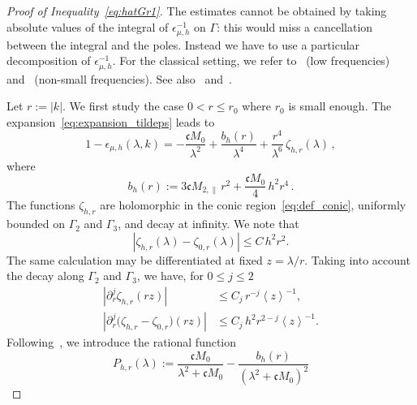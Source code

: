 \documentclass[a4paper,12pt]{amsart} %
\theoremstyle{plain}
\theoremstyle{definition}
\newcommand		{\lt}			{\left}				%
\newcommand		{\rt}			{\right}			%
\renewcommand	{\(}			{\lt(}
\renewcommand	{\)}			{\rt)}
\newcommand		{\bangle}[1]	{\lt\langle #1\rt\rangle}
\newcommand		{\weight}[1]	{\bangle{#1}}	%
\newcommand		{\n}[1]			{\lt\lvert{#1}\rt\rvert}	%
\newcommand	{\h}			{h}
\newcommand		{\CK}			{\mathfrak{c}}	%
\begin{document}
	\begin{proof}[Proof of Inequality~\eqref{eq:hatGr1}]
		The estimates cannot be obtained by taking absolute values of the integral of $\epsilon_{\mu,\h}^{-1}$ on $\Gamma$: this would miss a cancellation between the integral and the poles. Instead we have to use a particular decomposition of $\epsilon_{\mu,\h}^{-1}$. For the classical setting, we refer to~\cite[Lemma~2.7]{bedrossian_linearized_2022} (low frequencies) and~\cite[Lemma~2.8]{bedrossian_linearized_2022} (non-small frequencies). See also~\cite[Section~5.2.3]{han-kwan_linearized_2021} and~\cite[Theorem~1.2~(ii), especially~(1.25)]{ionescu_stability_2023}.

		Let $r := \n{k}$. We first study the case $0<r\leq r_0$ where $r_0$ is small enough. 
		The expansion~\eqref{eq:expansion_tildeps} leads to 
		\begin{equation}\label{eq:Lh-ray-expansion}
			1-\epsilon_{\mu,\h}(\lambda,k) = - \frac{\CK M_0}{\lambda^2} +\frac{b_\h(r)}{\lambda^4} + \frac{r^4}{\lambda^6} \, \zeta_{\h,r}(\lambda) \, ,
		\end{equation}
		where
		\begin{equation*}
			b_\h(r) := 3\CK M_{2,\parallel} \, r^2 +\frac{\CK M_0}{4} \, h^2r^4 \, .
		\end{equation*}
		The functions $\zeta_{\h,r}$ are holomorphic in the conic region~\eqref{eq:def_conic}, uniformly bounded on $\Gamma_2$ and $\Gamma_3$, and decay at infinity. 
		We note that
		\begin{equation}\label{eq:zeta-quantum-classical-difference}
			\n{\zeta_{\h,r}(\lambda)-\zeta_{0,r}(\lambda)} \leq C\, h^2r^2 .
		\end{equation}
		The same calculation may be differentiated at fixed $z=\lambda/r$. Taking into account
		the decay along $\Gamma_2$ and $\Gamma_3$, we have, for $0\leq j\leq2$
		\begin{align}\label{eq:zeta-radial-derivatives}
			\n{\partial_r^j\zeta_{\h,r}(rz)} &\leq C_j \, r^{-j} \weight{z}^{-1} ,
			\\\label{eq:zeta-difference-radial-derivatives}
			\n{\partial_r^j\bigl(\zeta_{\h,r}-\zeta_{0,r}\bigr)(rz)} &\leq C_j \, h^2 r^{2-j} \weight{z}^{-1} .
		\end{align}
		Following~\cite[Lemma~2.7]{bedrossian_linearized_2022}, we introduce the rational function
		\begin{equation}\label{eq:rational-surgery-correction}
			P_{\h,r}(\lambda) :=\frac{\CK M_0}{\lambda^2+\CK M_0} - \frac{b_\h(r)}{(\lambda^2+\CK M_0)^2}

\end{equation}
\end{proof}
\end{document}
